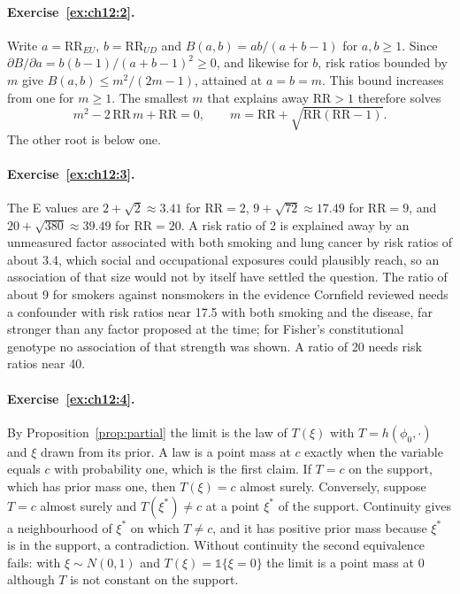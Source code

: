 \paragraph{Exercise~\ref{ex:ch12:2}.} Write $a = \mathrm{RR}_{EU}$, $b = \mathrm{RR}_{UD}$ and $B(a, b) = ab/(a + b - 1)$ for $a, b \ge 1$. Since $\partial B/\partial a = b(b - 1)/(a + b - 1)^2 \ge 0$, and likewise for $b$, risk ratios bounded by $m$ give $B(a,b) \le m^2/(2m - 1)$, attained at $a = b = m$. This bound increases from one for $m \ge 1$. The smallest $m$ that explains away $\mathrm{RR} > 1$ therefore solves
\[
m^2 - 2\,\mathrm{RR}\,m + \mathrm{RR} = 0, \qquad
m = \mathrm{RR} + \sqrt{\mathrm{RR}(\mathrm{RR} - 1)}.
\]
The other root is below one.

\paragraph{Exercise~\ref{ex:ch12:3}.} The E values are $2 + \sqrt{2} \approx 3.41$ for $\mathrm{RR} = 2$, $9 + \sqrt{72} \approx 17.49$ for $\mathrm{RR} = 9$, and $20 + \sqrt{380} \approx 39.49$ for $\mathrm{RR} = 20$. A risk ratio of 2 is explained away by an unmeasured factor associated with both smoking and lung cancer by risk ratios of about 3.4, which social and occupational exposures could plausibly reach, so an association of that size would not by itself have settled the question. The ratio of about 9 for smokers against nonsmokers in the evidence Cornfield reviewed needs a confounder with risk ratios near 17.5 with both smoking and the disease, far stronger than any factor proposed at the time; for Fisher's constitutional genotype no association of that strength was shown. A ratio of 20 needs risk ratios near 40. 

\paragraph{Exercise~\ref{ex:ch12:4}.} By Proposition~\ref{prop:partial} the limit is the law of $T(\xi)$ with $T = h(\phi_0, \cdot)$ and $\xi$ drawn from its prior. A law is a point mass at $c$ exactly when the variable equals $c$ with probability one, which is the first claim. If $T = c$ on the support, which has prior mass one, then $T(\xi) = c$ almost surely. Conversely, suppose $T = c$ almost surely and $T(\xi^\ast) \neq c$ at a point $\xi^\ast$ of the support. Continuity gives a neighbourhood of $\xi^\ast$ on which $T \neq c$, and it has positive prior mass because $\xi^\ast$ is in the support, a contradiction. Without continuity the second equivalence fails: with $\xi \sim N(0, 1)$ and $T(\xi) = \mathbb{1}\{\xi = 0\}$ the limit is a point mass at $0$ although $T$ is not constant on the support.

